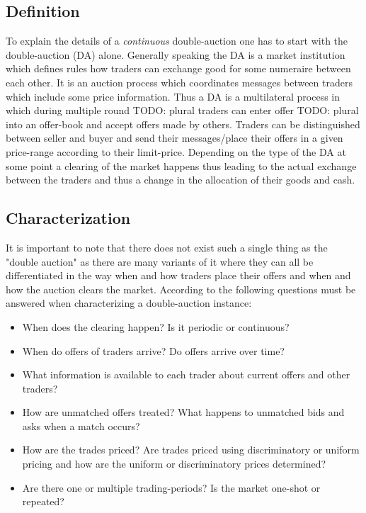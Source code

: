 \documentclass[../Bachelorarbeit.tex]{subfiles}
\begin{document}
\subsection{Definition}
To explain the details of a \textit{continuous} double-auction one has to start with the double-auction (DA) alone. Generally speaking the DA is a \gls{market institution} which defines rules how traders can exchange \gls{good} for some \gls{numeraire} between each other. It is an \gls{auction} process which coordinates messages between traders which include some price information. Thus a DA is a multilateral process in which during multiple \gls{round} TODO: plural traders can enter \gls{offer} TODO: plural into an \gls{offer-book} and accept offers made by others. Traders can be distinguished between \gls{seller} and \gls{buyer} and send their messages/place their offers in a given price-range according to their \gls{limit-price}. Depending on the type of the DA at some point a \gls{clearing} of the market happens thus leading to the actual exchange between the traders and thus a change in the allocation of their goods and cash. \cite{Parsons2006}

\subsection{Characterization}
It is important to note that there does not exist such a single thing as the "double auction" as there are many variants of it where they can all be differentiated in the way when and how traders place their offers and when and how the auction clears the market. According to \cite{Parsons2006} the following questions must be answered when characterizing a double-auction instance:

\begin{itemize}
\item When does the clearing happen? Is it periodic or continuous?
\item When do offers of traders arrive? Do offers arrive over time?
\item What information is available to each trader about current offers and other traders?
\item How are unmatched offers treated? What happens to unmatched bids and asks when a match occurs?
\item How are the trades priced? Are trades priced using discriminatory or uniform pricing and how are the uniform or discriminatory prices determined?
\item Are there one or multiple trading-periods? Is the market one-shot or repeated?
\end{itemize}
\end{document}
